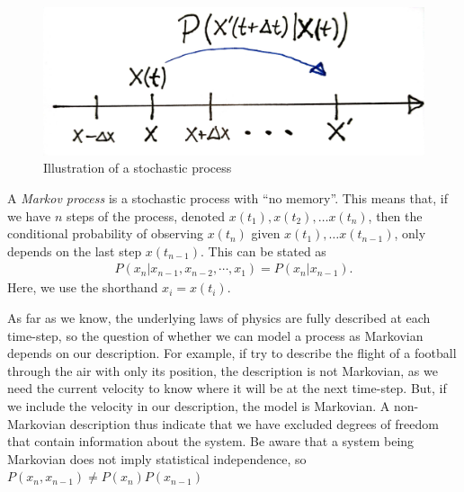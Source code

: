 \begin{figure}[!htb]
    \centering
    \includegraphics[width=.4\textwidth]{fig/fig1.jpg}
    \caption{Illustration of a stochastic process}
    \label{fig: stochastic process}
\end{figure}


A \emph{Markov process} is a stochastic process with ``no memory''.
This means that, if we have $n$ steps of the process, denoted $x(t_1), x(t_2), \dots x(t_n)$, then the conditional probability of observing $x(t_n)$ given $x(t_1), \dots x(t_{n-1})$, only depends on the last step $x(t_{n-1})$.
This can be stated as
%
\begin{align}
    P(x_n |x_{n-1}, x_{n-2}, \cdots, x_1) = P(x_n | x_{n-1}).
\end{align}
%
Here, we use the shorthand $x_i = x(t_i)$.

As far as we know, the underlying laws of physics are fully described at each time-step, so the question of whether we can model a process as Markovian depends on our description.
For example, if try to describe the flight of a football through the air with only its position, the description is not Markovian, as we need the current velocity to know where it will be at the next time-step.
But, if we include the velocity in our description, the model is Markovian.
A non-Markovian description thus indicate that we have excluded degrees of freedom that contain information about the system.
Be aware that a system being Markovian does not imply statistical independence, so $P(x_{n}, x_{n-1})\neq P(x_n)P(x_{n-1})$


